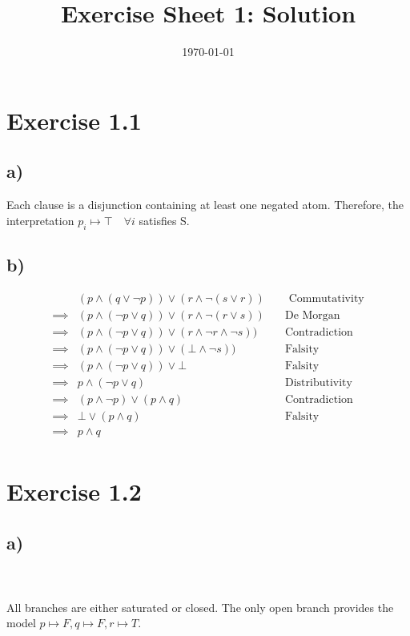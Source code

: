\documentclass[a4paper]{article}
\begin{document}
\title{Exercise Sheet 1: Solution}
\author{}
\date{\today}
\section{Exercise 1.1}
\subsection{a)}
Each clause is a disjunction containing at least one negated atom. Therefore, the interpretation $p_i \mapsto \top \quad \forall i$ satisfies S.
\subsection{b)}
\begin{align*}
&(p \land (q \lor \lnot p))\lor(r \land \lnot(s \lor r)) \quad& \text{ Commutativity}\\
\implies&(p \land (\lnot p \lor q))\lor(r \land \lnot(r \lor s)) & \text{De Morgan}\\
\implies&(p \land (\lnot p \lor q))\lor(r \land \lnot r \land \lnot s)) & \text{Contradiction}\\
\implies&(p \land (\lnot p \lor q))\lor(\bot \land \lnot s)) & \text{Falsity}\\
\implies&(p \land (\lnot p \lor q))\lor\bot & \text{Falsity}\\
\implies& p \land (\lnot p \lor q) & \text{Distributivity}\\
\implies&(p \land \lnot p) \lor (p \land q) & \text{Contradiction}\\
\implies&\bot \lor (p \land q) & \text{Falsity}\\
\implies& p \land q & \\
\end{align*}
\section{Exercise 1.2}
\subsection{a)}
\\\\
All branches are either saturated or closed. The only open branch provides the model
$p \mapsto F, q \mapsto F, r \mapsto T$.
\end{document}
